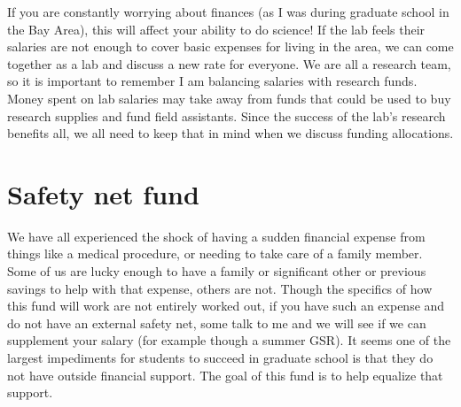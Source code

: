 \documentclass[12pt]{article}
\begin{document}
If you are constantly worrying about finances (as I was during
graduate school in the Bay Area), this will affect your ability to do
science! If the lab feels their salaries are not enough to cover basic
expenses for living in the area, we can come together as a lab and
discuss a new rate for everyone. We are all a research team, so it is
important to remember I am balancing salaries with research
funds. Money spent on lab salaries may take away from funds that could
be used to buy research supplies and fund field assistants. Since the
success of the lab's research benefits all, we all need to keep that
in mind when we discuss funding allocations.

\section{Safety net fund}
We have all experienced the shock of having a sudden financial expense
from things like a medical procedure, or needing to take care of a
family member. Some of us are lucky enough to have a family or
significant other or previous savings to help with that expense,
others are not. Though the specifics of how this fund will work are
not entirely worked out, if you have such an expense and do not have
an external safety net, some talk to me and we will see if we can
supplement your salary (for example though a summer GSR). It seems one
of the largest impediments for students to succeed in graduate school
is that they do not have outside financial support. The goal of this
fund is to help equalize that support.
\end{document}
